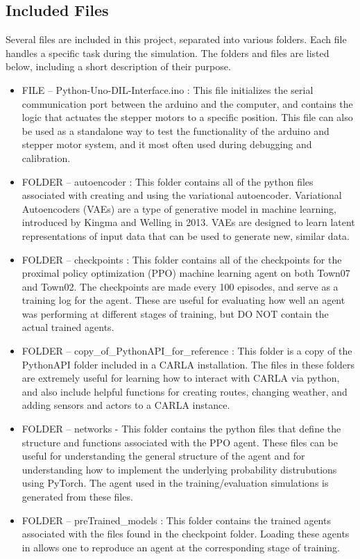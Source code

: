 \documentclass{article}
\begin{document}
\subsection{Included Files}
Several files are included in this project, separated into various folders. Each file handles a specific task during the simulation. The folders and files are listed below, including a short description of their purpose.
\begin{itemize}
\item FILE -- Python-Uno-DIL-Interface.ino : This file initializes the serial communication port between the arduino and the computer, and contains the logic that actuates the stepper motors to a specific position. This file can also be used as a standalone way to test the functionality of the arduino and stepper motor system, and it most often used during debugging and calibration.
\item FOLDER -- autoencoder : This folder contains all of the python files associated with creating and using the variational autoencoder. Variational Autoencoders (VAEs) are a type of generative model in machine learning, introduced by Kingma and Welling in 2013. VAEs are designed to learn latent representations of input data that can be used to generate new, similar data.
\item FOLDER -- checkpoints : This folder contains all of the checkpoints for the proximal policy optimization (PPO) machine learning agent on both Town07 and Town02. The checkpoints are made every 100 episodes, and serve as a training log for the agent. These are useful for evaluating how well an agent was performing at different stages of training, but DO NOT contain the actual trained agents.
\item FOLDER -- copy\_of\_PythonAPI\_for\_reference : This folder is a copy of the PythonAPI folder included in a CARLA installation. The files in these folders are extremely useful for learning how to interact with CARLA via python, and also include helpful functions for creating routes, changing weather, and adding sensors and actors to a CARLA instance. 
\item FOLDER -- networks - This folder contains the python files that define the structure and functions associated with the PPO agent. These files can be useful for understanding the general structure of the agent and for understanding how to implement the underlying probability distrubutions using PyTorch. The agent used in the training/evaluation simulations is generated from these files.
\item FOLDER -- preTrained\_models : This folder contains the trained agents associated with the files found in the checkpoint folder. Loading these agents in allows one to reproduce an agent at the corresponding stage of training.

\end{itemize}
\end{document}
